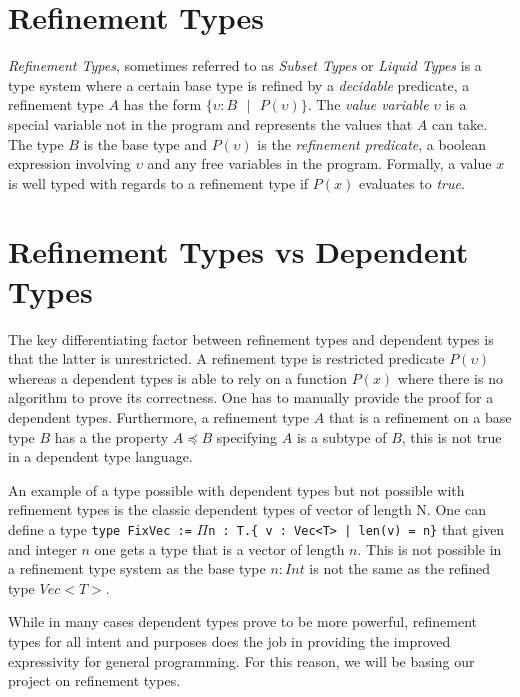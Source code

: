 \documentclass[a4paper,12pt]{report}
\begin{document}
\section{Refinement Types}
\textit{Refinement Types}, sometimes referred to as \textit{Subset Types} 
\cite{subsetTypes} or \textit{Liquid Types} \cite{liquidTypes} 
is a type system where a certain base type is refined by a 
\textit{decidable} predicate, a refinement type $A$ has the form 
$\{\upsilon : B\text{ }|\text{ }P(\upsilon)\}$. The \textit{value variable} 
$\upsilon$ is a special variable not in the program and 
represents the values that $A$ can take. The type $B$ is the 
base type and $P(\upsilon)$ is the \textit{refinement predicate}, 
a boolean expression involving $\upsilon$ and any free variables in the program. 
Formally, a value $x$ is well typed with regards to a refinement type 
if $P(x)$ evaluates to \textit{true}.

\section{Refinement Types vs Dependent Types}

The key differentiating factor between refinement types and dependent types is 
that the latter is unrestricted. A refinement type is restricted predicate 
$P(\upsilon)$ whereas a dependent types is able to rely on a function $P(x)$ 
where there is no algorithm to prove its correctness. One has to manually 
provide the proof for a dependent types. Furthermore, a refinement type $A$ 
that is a refinement on a base type $B$ has a the property $A \preceq B$ 
specifying $A$ is a subtype of $B$, this is not true in a dependent type 
language.

\par
An example of a type possible with dependent types but not possible with 
refinement types is the classic dependent types of vector of length N. One can 
define a type \verb|type FixVec :=| $\Pi$\verb+n : T.{ v : Vec<T> | len(v) = n}+ 
that given and integer $n$ one gets a type that is a vector of length $n$. This 
is not possible in a refinement type system as the base type $n : Int$ is not 
the same as the refined type $Vec<T>$.

\par
While in many cases dependent types prove to be 
more powerful, refinement types for all intent and purposes does the job in 
providing the improved expressivity for general programming. For this reason, we 
will be basing our project on refinement types. 
\end{document}
